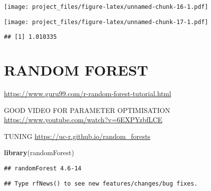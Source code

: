 \documentclass[
]{article}
\newenvironment{Shaded}{\begin{snugshade}}{\end{snugshade}}
\newcommand{\DecValTok}[1]{\textcolor[rgb]{0.00,0.00,0.81}{#1}}
\newcommand{\KeywordTok}[1]{\textcolor[rgb]{0.13,0.29,0.53}{\textbf{#1}}}
\newcommand{\NormalTok}[1]{#1}
\newcommand{\OperatorTok}[1]{\textcolor[rgb]{0.81,0.36,0.00}{\textbf{#1}}}
\newcommand{\StringTok}[1]{\textcolor[rgb]{0.31,0.60,0.02}{#1}}
\begin{document}
\texttt{[image: project\_files/figure-latex/unnamed-chunk-16-1.pdf]}

\begin{Shaded}
\end{Shaded}

\texttt{[image: project\_files/figure-latex/unnamed-chunk-17-1.pdf]}

\begin{Shaded}
\end{Shaded}

\begin{verbatim}
## [1] 1.010335
\end{verbatim}

\hypertarget{random-forest}{%
\section{RANDOM FOREST}\label{random-forest}}

\url{https://www.guru99.com/r-random-forest-tutorial.html}

GOOD VIDEO FOR PARAMETER OPTIMISATION
\url{https://www.youtube.com/watch?v=6EXPYzbfLCE}

TUNING \url{https://uc-r.github.io/random_forests}

\begin{Shaded}
\begin{Highlighting}[]
\KeywordTok{library}\NormalTok{(randomForest)}
\end{Highlighting}
\end{Shaded}

\begin{verbatim}
## randomForest 4.6-14
\end{verbatim}

\begin{verbatim}
## Type rfNews() to see new features/changes/bug fixes.
\end{verbatim}
\end{document}

